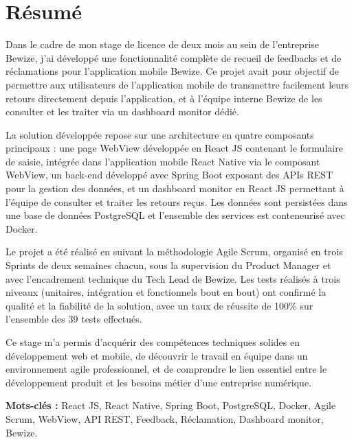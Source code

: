 \chapter*{Résumé}

Dans le cadre de mon stage de licence de deux mois au sein de 
l'entreprise Bewize, j'ai développé une fonctionnalité complète 
de recueil de feedbacks et de réclamations pour l'application 
mobile Bewize. Ce projet avait pour objectif de permettre aux 
utilisateurs de l'application mobile de transmettre facilement 
leurs retours directement depuis l'application, et à l'équipe 
interne Bewize de les consulter et les traiter via un dashboard 
monitor dédié.

La solution développée repose sur une architecture en quatre 
composants principaux : une page WebView développée en React JS 
contenant le formulaire de saisie, intégrée dans l'application 
mobile React Native via le composant WebView, un back-end développé 
avec Spring Boot exposant des APIs REST pour la gestion des données, 
et un dashboard monitor en React JS permettant à l'équipe de 
consulter et traiter les retours reçus. Les données sont persistées 
dans une base de données PostgreSQL et l'ensemble des services 
est conteneurisé avec Docker.

Le projet a été réalisé en suivant la méthodologie Agile Scrum, 
organisé en trois Sprints de deux semaines chacun, sous la 
supervision du Product Manager et avec l'encadrement technique 
du Tech Lead de Bewize. Les tests réalisés à trois niveaux 
(unitaires, intégration et fonctionnels bout en bout) ont confirmé 
la qualité et la fiabilité de la solution, avec un taux de réussite 
de 100\% sur l'ensemble des 39 tests effectués.

Ce stage m'a permis d'acquérir des compétences techniques solides 
en développement web et mobile, de découvrir le travail en équipe 
dans un environnement agile professionnel, et de comprendre le 
lien essentiel entre le développement produit et les besoins 
métier d'une entreprise numérique.

\vspace{1cm}

\textbf{Mots-clés :} React JS, React Native, Spring Boot, PostgreSQL, 
Docker, Agile Scrum, WebView, API REST, Feedback, Réclamation, 
Dashboard monitor, Bewize.